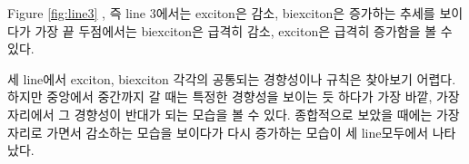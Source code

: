 Figure \ref{fig:line3} , 즉 line 3에서는 exciton은 감소, biexciton은 증가하는 추세를 보이다가 가장 끝 두점에서는 biexciton은 급격히 감소, exciton은 급격히 증가함을 볼 수 있다.

세 line에서 exciton, biexciton 각각의 공통되는 경향성이나 규칙은 찾아보기 어렵다. 하지만 중앙에서 중간까지 갈 때는 특정한 경향성을 보이는 듯 하다가 가장 바깥, 가장자리에서 그 경향성이 반대가 되는 모습을 볼 수 있다. 종합적으로 보았을 때에는 가장자리로 가면서 감소하는 모습을 보이다가 다시 증가하는 모습이 세 line모두에서 나타났다.


	